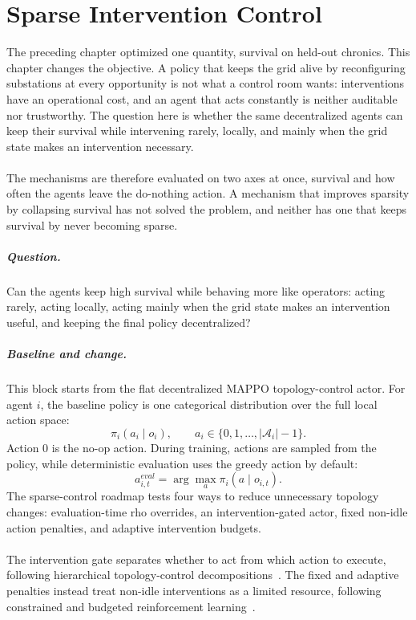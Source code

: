 \chapter{Sparse Intervention Control}
\label{ch:sparse-control}

The preceding chapter optimized one quantity, survival on held-out chronics.
This chapter changes the objective. A policy that keeps the grid
alive by reconfiguring substations at every opportunity is not what a control
room wants: interventions have an operational cost, and an agent that acts
constantly is neither auditable nor trustworthy. The question here is whether
the same decentralized agents can keep their survival while intervening rarely,
locally, and mainly when the grid state makes an intervention necessary.
\\
\\
The mechanisms are therefore evaluated on two axes at once, survival and how
often the agents leave the do-nothing action. A mechanism that improves
sparsity by collapsing survival has not solved the problem, and neither has one
that keeps survival by never becoming sparse.


\paragraph{Question.}
Can the agents keep high survival while behaving more like operators: acting
rarely, acting locally, acting mainly when the grid state makes an intervention
useful, and keeping the final policy decentralized?

\paragraph{Baseline and change.}
This block starts from the flat decentralized MAPPO topology-control actor. For
agent \(i\), the baseline policy is one categorical distribution over the full
local action space:
\[
  \pi_i(a_i \mid o_i),
  \qquad
  a_i \in \{0,1,\ldots,|\mathcal A_i|-1\}.
\]
Action \(0\) is the no-op action. During training, actions are sampled from the
policy, while deterministic evaluation uses the greedy action by default:
\[
  a_{i,t}^{eval}=\arg\max_a \pi_i(a\mid o_{i,t}).
\]
The sparse-control roadmap tests four ways to reduce unnecessary topology
changes: evaluation-time rho overrides, an intervention-gated actor, fixed
non-idle action penalties, and adaptive intervention budgets.
\\
\\
The intervention gate separates whether to act from which action to execute,
following hierarchical topology-control decompositions~\cite{manczak2023hrl,
vandersar2023hmarl}. The fixed and adaptive penalties instead treat non-idle
interventions as a limited resource, following constrained and budgeted
reinforcement learning~\cite{achiam2017cpo,stooke2020pid,carrara2019budgeted}.


